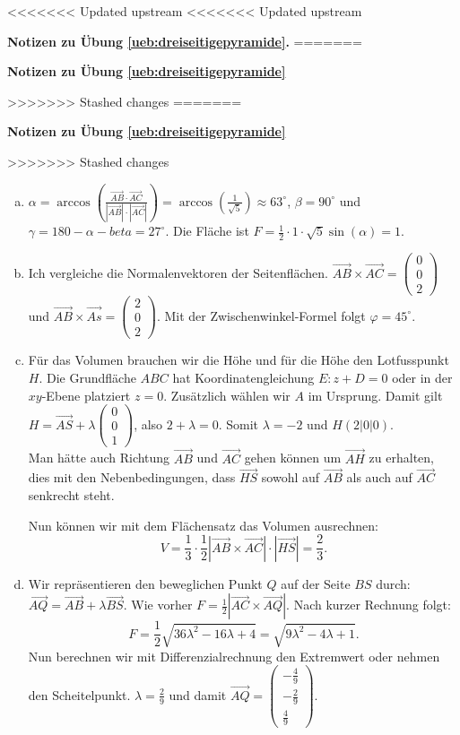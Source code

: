 \documentclass[%
11pt,%
twoside,%
titlepage,%
<<<<<<< Updated upstream
<<<<<<< Updated upstream
german,%
=======
swissgerman,%
>>>>>>> Stashed changes
=======
swissgerman,%
>>>>>>> Stashed changes
headsepline%
]{scrartcl}
\newcommand{\faReturnGray}{\textcolor{gray}{\faMailReply}} %
\newcommand{\faReturnGray}{\textcolor{gray}{\faMailReply}} %
\theoremstyle{definition}
\theoremstyle{plain}
\newcommand{\concatueb}[1]{ueb:#1}%
\newcommand{\concatlsg}[1]{lsg:#1}%
\newenvironment{lsg}[1]{%
<<<<<<< Updated upstream
<<<<<<< Updated upstream
    \par\noindent\textbf{Notizen zu Übung \ref{\concatueb{#1}}.}%
    \label{\concatlsg{#1}}
=======
    \par\noindent\textbf{Notizen zu Übung \ref{\concatueb{#1}}}\label{\concatlsg{#1}}
    \hfill\hyperref[\concatueb{#1}]{\faReturnGray}\par %
>>>>>>> Stashed changes
=======
    \par\noindent\textbf{Notizen zu Übung \ref{\concatueb{#1}}}\label{\concatlsg{#1}}
    \hfill\hyperref[\concatueb{#1}]{\faReturnGray}\par %
>>>>>>> Stashed changes
}{%
    \par%
}
\begin{document}
\begin{lsg}{dreiseitigepyramide}
    \begin{enumerate}[a)]
        \item $\alpha=\arccos\left(\frac{\vec{AB}\cdot\vec{AC}}{|\vec{AB}|\cdot|\vec{AC}|}\right)=\arccos(\frac{1}{\sqrt{5}})\approx63^\circ$, $\beta=90^\circ$ und $\gamma=180-\alpha-beta=27^\circ$. Die Fläche ist $F=\frac{1}{2}\cdot1\cdot\sqrt{5}\sin(\alpha)=1$.

        \item Ich vergleiche die Normalenvektoren der Seitenflächen. $\vec{AB}\times\vec{AC}=\begin{pmatrix}
            0\\0\\2
        \end{pmatrix}$ und $\vec{AB}\times\vec{As}=\begin{pmatrix}
            2\\0\\2
        \end{pmatrix}$. Mit der Zwischenwinkel-Formel folgt $\varphi=45^\circ$.

        \item Für das Volumen brauchen wir die Höhe und für die Höhe den Lotfusspunkt $H$. Die Grundfläche $ABC$ hat Koordinatengleichung $E:z+D=0$ oder in der $xy$-Ebene platziert $z=0$. Zusätzlich wählen wir $A$ im Ursprung. Damit gilt $H=\vec{AS}+\lambda\begin{pmatrix}
            0\\0\\1
        \end{pmatrix}$, also $2+\lambda=0$. Somit $\lambda=-2$ und $H(2|0|0)$.\\
        Man hätte auch Richtung $\vec{AB}$ und $\vec{AC}$ gehen können um $\vec{AH}$ zu erhalten, dies mit den Nebenbedingungen, dass $\vec{HS}$ sowohl auf $\vec{AB}$ als auch auf $\vec{AC}$ senkrecht steht.

        Nun können wir mit dem Flächensatz das Volumen ausrechnen:
        $$V=\frac{1}{3}\cdot\frac{1}{2}|\vec{AB}\times\vec{AC}|\cdot|\vec{HS}|=\frac{2}{3}.$$

        \item Wir repräsentieren den beweglichen Punkt $Q$ auf der Seite $BS$ durch: $\vec{AQ}=\vec{AB}+\lambda\vec{BS}$. Wie vorher $F=\frac{1}{2}|\vec{AC}\times\vec{AQ}|$. Nach kurzer Rechnung folgt:
        $$F=\frac{1}{2}\sqrt{36\lambda^2-16\lambda+4}=\sqrt{9\lambda^2-4\lambda+1}.$$
        Nun berechnen wir mit Differenzialrechnung den Extremwert oder nehmen den Scheitelpunkt. $\lambda=\frac{2}{9}$ und damit $\vec{AQ}=\begin{pmatrix}
            -\frac{4}{9}\\-\frac{2}{9}\\ \frac{4}{9}
        \end{pmatrix}$.
    \end{enumerate}
\end{lsg}
\end{document}
